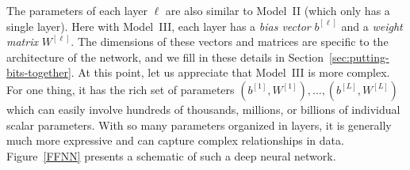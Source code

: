 The parameters of each layer $\ell$ are also similar to Model~II (which only has a single layer). Here with Model~III, each layer has a {\em bias vector} $b^{[\ell]}$ and a {\em weight matrix} $W^{[\ell]}$. The dimensions of these vectors and matrices are specific to the architecture of the network, and we fill in these details in Section~\ref{sec:putting-bits-together}. At this point, let us appreciate that Model~III is more complex. For one thing, it has the rich set of parameters $(b^{[1]}, W^{[1]}), \ldots, (b^{[L]}, W^{[L]})$ which can easily involve hundreds of thousands, millions, or billions of individual scalar parameters.  With so many parameters organized in layers, it is generally much more expressive and can capture complex relationships in data. Figure~\ref{FFNN} presents a schematic of such a deep neural network.
